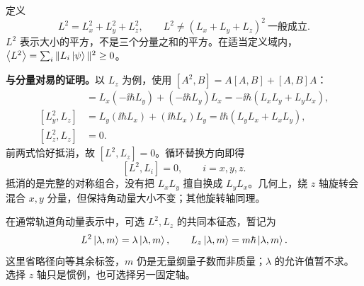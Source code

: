 
定义
\begin{equation}
  \boxed{L^2=L_x^2+L_y^2+L_z^2},
  \qquad L^2\neq(L_x+L_y+L_z)^2\ \text{一般成立}.
\end{equation}
$L^2$ 表示大小的平方，不是三个分量之和的平方。在适当定义域内，$\left\langle L^2 \right\rangle=\sum_i\|L_i\left|\psi\right\rangle\|^2\geq0$。

\textbf{与分量对易的证明。}以 $L_z$ 为例，使用 $[A^2,B]=A[A,B]+[A,B]A$：
\begin{align}
  [L_x^2,L_z]
  &=L_x(-\ii\hbar L_y)+(-\ii\hbar L_y)L_x
   =-\ii\hbar(L_xL_y+L_yL_x),\\
  [L_y^2,L_z]
  &=L_y(\ii\hbar L_x)+(\ii\hbar L_x)L_y
   =\ii\hbar(L_yL_x+L_xL_y),\\
  [L_z^2,L_z]&=0.
\end{align}
前两式恰好抵消，故 $[L^2,L_z]=0$。循环替换方向即得
\begin{equation}
  \boxed{[L^2,L_i]=0,\qquad i=x,y,z.}
  \label{eq:QM-C12-S04-square-commutes}
\end{equation}
抵消的是完整的对称组合，没有把 $L_xL_y$ 擅自换成 $L_yL_x$。几何上，绕 $z$ 轴旋转会混合 $x,y$ 分量，但保持角动量大小不变；其他旋转轴同理。

在通常轨道角动量表示中，可选 $L^2,L_z$ 的共同本征态，暂记为
\begin{equation}
  L^2\left|\lambda,m\right\rangle=\lambda\left|\lambda,m\right\rangle,\qquad
  L_z\left|\lambda,m\right\rangle=m\hbar\left|\lambda,m\right\rangle.
\end{equation}
这里省略径向等其余标签，$m$ 仍是无量纲量子数而非质量；$\lambda$ 的允许值暂不求。选择 $z$ 轴只是惯例，也可选择另一固定轴。



